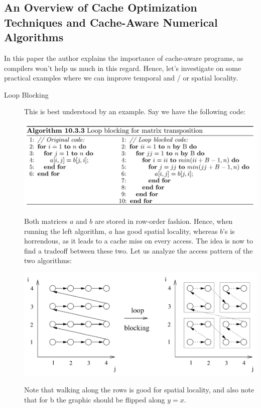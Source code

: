 \documentclass[../../main.tex]{subfiles}
\begin{document}
\bigskip
\subsection{An Overview of Cache Optimization Techniques and Cache-Aware Numerical Algorithms}
In this paper the author explains the importance of cache-aware programs, as compilers won't help us much in this regard. Hence, let's investigate on some practical examples where we can improve temporal and / or spatial locality.

\begin{description}
    \item[Loop Blocking] This is best understood by an example. Say we have the following code:
    
    \includegraphics[width=\linewidth]{Chapters/09/loop_blocking.png}

    Both matrices $a$ and $b$ are stored in row-order fashion. Hence, when running the left algorithm, $a$ has good spatial locality, whereas $b$'s is horrendous, as it leads to a cache miss on every access. The idea is now to find a tradeoff between these two. Let us analyze the access pattern of the two algorithms:

    \includegraphics[width=\linewidth]{Chapters/09/access_pattern.png}

    Note that walking along the rows is good for spatial locality, and also note that for b the graphic should be flipped along $y=x$.


\end{description}
\end{document}
